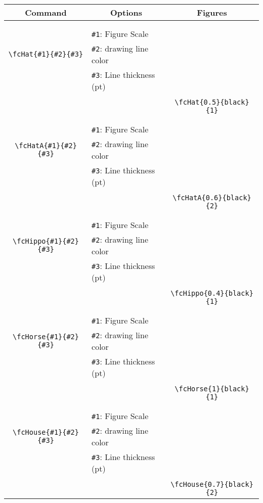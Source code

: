\documentclass[x11names]{article}
\begin{document}
\begin{table}[H]\centering\begin{tabular}{|c|l|c|}\hline {\bf Command}& \multicolumn{1}{c|}{{\bf Options}} & {\bf Figures}\\  \hline	&&\multirow{5}{*}{\fcHat{0.5}{black}{1}}\\	&&\\	&\verb|#1|: Figure Scale &\\	\verb|\fcHat{#1}{#2}{#3}|&	\verb|#2|: drawing line color &\\	&\verb|#3|: Line thickness (pt) &\\ &&\\&&	\verb|\fcHat{0.5}{black}{1}|\\\hline 	
	&&\multirow{5}{*}{\fcHatA{0.6}{black}{2}}\\	&&\\	&\verb|#1|: Figure Scale &\\	\verb|\fcHatA{#1}{#2}{#3}|&	\verb|#2|: drawing line color &\\	&\verb|#3|: Line thickness (pt) &\\ &&\\&&	\verb|\fcHatA{0.6}{black}{2}|\\\hline 	
	&&\multirow{5}{*}{\fcHippo{0.4}{black}{1}}\\	&&\\	&\verb|#1|: Figure Scale &\\	\verb|\fcHippo{#1}{#2}{#3}|&	\verb|#2|: drawing line color &\\	&\verb|#3|: Line thickness (pt) &\\ &&\\&&	\verb|\fcHippo{0.4}{black}{1}|\\\hline 	
	&&\multirow{5}{*}{\fcHorse{1}{black}{1}}\\	&&\\	&\verb|#1|: Figure Scale &\\	\verb|\fcHorse{#1}{#2}{#3}|&	\verb|#2|: drawing line color &\\	&\verb|#3|: Line thickness (pt) &\\ &&\\&&	\verb|\fcHorse{1}{black}{1}|\\\hline 	
	&&\multirow{5}{*}{\fcHouse{0.7}{black}{2}}\\	&&\\	&\verb|#1|: Figure Scale &\\	\verb|\fcHouse{#1}{#2}{#3}|&	\verb|#2|: drawing line color &\\	&\verb|#3|: Line thickness (pt) &\\ &&\\&&	\verb|\fcHouse{0.7}{black}{2}|\\\hline 	

\end{tabular}
\end{table}
\end{document}
